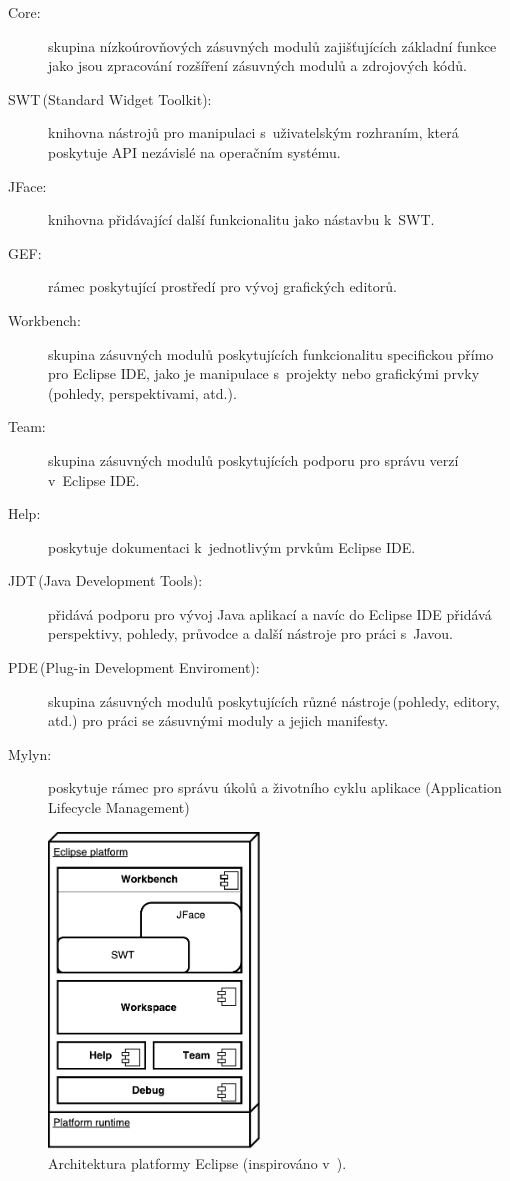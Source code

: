   \begin{description}
    \item[Core:] skupina nízkoúrovňových zásuvných modulů zajišťujících základní funkce jako jsou zpracování rozšíření zásuvných modulů a zdrojových kódů.
    \item[SWT\,(Standard Widget Toolkit):] knihovna nástrojů pro manipulaci s~uživatelským rozhraním, která poskytuje API nezávislé na operačním systému.
    \item[JFace:] knihovna přidávající další funkcionalitu jako nástavbu k~SWT.
    \item[GEF:] rámec poskytující prostředí pro vývoj grafických editorů.
    \item[Workbench:] skupina zásuvných modulů poskytujících funkcionalitu specifickou přímo pro Eclipse IDE, jako je manipulace s~projekty nebo grafickými prvky (pohledy, perspektivami, atd.).
    \item[Team:] skupina zásuvných modulů poskytujících podporu pro správu verzí v~Eclipse IDE.
    \item[Help:] poskytuje dokumentaci k~jednotlivým prvkům Eclipse IDE.
    \item[JDT\,(Java Development Tools)\footnotemark:]  přidává podporu pro vývoj Java aplikací a navíc do Eclipse IDE přidává perspektivy, pohledy, průvodce a další nástroje pro práci s~Javou.
    \item[PDE\,(Plug-in Development Enviroment)\footnotemark:]  skupina zásuvných modulů poskytujících různé nástroje\,(pohledy, editory, atd.) pro práci se zásuvnými moduly a jejich manifesty.
    \item[Mylyn:] poskytuje rámec pro správu úkolů a životního cyklu aplikace (Application Lifecycle Management)
  \end{description}

  \begin{figure}
    \includegraphics[width=0.5\textwidth, center]{obrazky-figures/eclipse_arch.pdf}
    \caption[Architektura platformy Eclipse.]{Architektura platformy Eclipse (inspirováno v~\cite{eclipse-platform}).}
    \label{fig:eclipse_arch}
  \end{figure}


